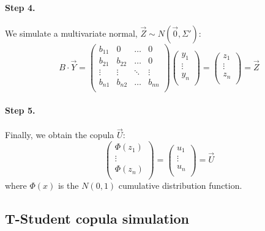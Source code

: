 \documentclass[a4paper,12pt,final]{article}
\begin{document}
\paragraph{Step 4.} We simulate a multivariate normal, $\vec{Z} \sim N(\vec{0}, \Sigma')$:
\begin{displaymath}
B \cdot \vec{Y} 
=
\left(
\begin{array}{cccc}
b_{11}   & 0        & \ldots & 0       \\
b_{21}   & b_{22}   & \ldots & 0       \\
\vdots  & \vdots  & \ddots & \vdots    \\
b_{n1}   & b_{n2}   & \ldots & b_{nn}  \\
\end{array}
\right)
\left(
\begin{array}{c}
y_1    \\
\vdots \\
y_n    \\
\end{array}
\right) 
=
\left(
\begin{array}{c}
z_1    \\
\vdots \\
z_n    \\
\end{array}
\right) 
= 
\vec{Z}
\end{displaymath}

\paragraph{Step 5.} Finally, we obtain the copula $\vec{U}$:
\begin{displaymath}
\left(
\begin{array}{c}
\Phi(z_1) \\
\vdots    \\
\Phi(z_n) \\
\end{array}
\right) 
=
\left(
\begin{array}{c}
u_1    \\
\vdots \\
u_n    \\
\end{array}
\right) 
=
\vec{U} 
\end{displaymath}
where $\Phi(x)$ is the $N(0,1)$ cumulative distribution function.

\subsection{T-Student copula simulation}
\label{ap:tstudentcopu}
\end{document}

